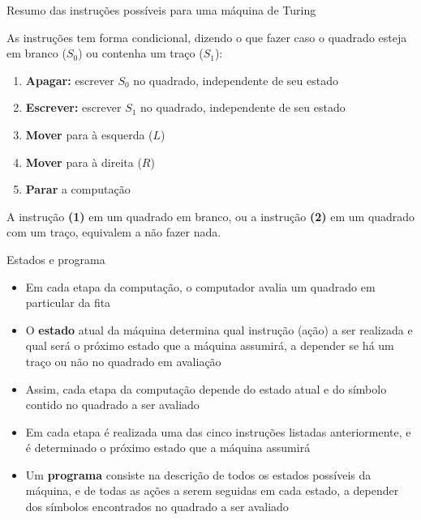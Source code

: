 \begin{frame}[fragile]{Resumo das instruções possíveis para uma máquina de Turing}

    As instruções tem forma condicional, dizendo o que fazer caso o quadrado esteja em branco
    ($S_0$) ou contenha um traço ($S_1$):

    \vspace{0.1in}

    \begin{enumerate}[(1)]
        \item \textbf{Apagar:} escrever $S_0$ no quadrado, independente de seu estado
        \item \textbf{Escrever:} escrever $S_1$ no quadrado, independente de seu estado
        \item \textbf{Mover} para à esquerda ($L$)
        \item \textbf{Mover} para à direita ($R$)
        \item \textbf{Parar} a computação
    \end{enumerate}

    \vspace{0.1in}
    A instrução \textbf{(1)} em um quadrado em branco, ou a instrução \textbf{(2)} em um quadrado
    com um traço, equivalem a não fazer nada.
\end{frame}

\begin{frame}[fragile]{Estados e programa}

    \begin{itemize}
        \item Em cada etapa da computação, o computador avalia um quadrado em particular da fita

        \item O \textbf{estado} atual da máquina determina qual instrução (ação) a ser realizada
            e qual será o próximo estado que a 
            máquina assumirá, a depender se há um traço ou não no quadrado em avaliação

        \item Assim, cada etapa da computação depende do estado atual e do símbolo contido no 
            quadrado a ser avaliado

        \item Em cada etapa é realizada uma das cinco instruções listadas anteriormente, e é 
            determinado o próximo estado que a máquina assumirá

        \item Um \textbf{programa} consiste na descrição de todos os estados possíveis da máquina,
            e de todas as ações a serem seguidas em cada estado, a depender dos símbolos 
            encontrados no quadrado a ser avaliado
    \end{itemize}

\end{frame}

